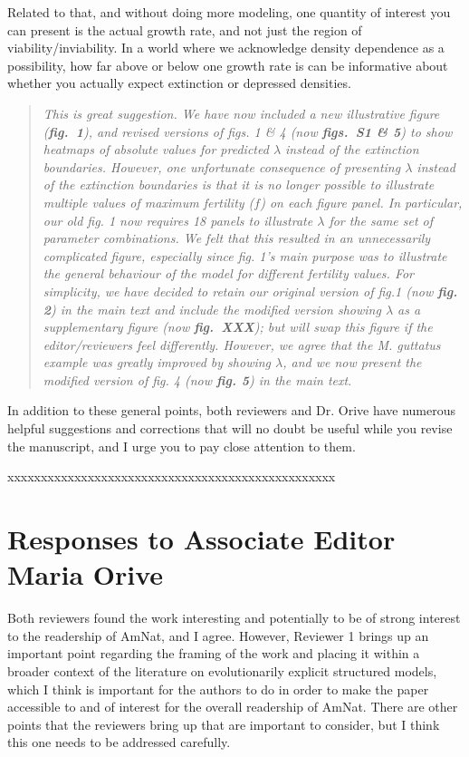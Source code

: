\documentclass[11pt]{article}
\begin{document}
Related to that, and without doing more modeling, one quantity of interest you can present is the actual growth rate, and not just the region of viability/inviability. In a world where we acknowledge density dependence as a possibility, how far above or below one growth rate is can be informative about whether you actually expect extinction or depressed densities.

\begin{quote}
	{\itshape This is great suggestion. We have now included a new illustrative figure ({\bf fig.~1}), and revised versions of figs. 1 \& 4 (now {\bf figs.~S1 \& 5}) to show heatmaps of absolute values for predicted $\lambda$ instead of the extinction boundaries. However, one unfortunate consequence of presenting $\lambda$ instead of the extinction boundaries is that it is no longer possible to illustrate multiple values of maximum fertility ($f$) on each figure panel. In particular, our old fig. 1 now requires 18 panels to illustrate $\lambda$ for the same set of parameter combinations. We felt that this resulted in an unnecessarily complicated figure, especially since fig. 1's main purpose was to illustrate the general behaviour of the model for different fertility values. For simplicity, we have decided to retain our original version of fig.1 (now {\bf fig. 2}) in the main text and include the modified version showing $\lambda$ as a supplementary figure (now {\bf fig.~XXX}); but will swap this figure if the editor/reviewers feel differently. However, we agree that the {\itshape M. guttatus} example was greatly improved by showing $\lambda$, and we now present the modified version of fig. 4 (now {\bf fig. 5}) in the main text}.
\end{quote}


In addition to these general points, both reviewers and Dr. Orive have numerous helpful suggestions and corrections that will no doubt be useful while you revise the manuscript, and I urge you to pay close attention to them.
\bigskip


\noindent xxxxxxxxxxxxxxxxxxxxxxxxxxxxxxxxxxxxxxxxxxxxxxxxx

\section*{Responses to Associate Editor Maria Orive}

Both reviewers found the work interesting and potentially to be of strong interest to the readership of AmNat, and I agree. However, Reviewer 1 brings up an important point regarding the framing of the work and placing it within a broader context of the literature on evolutionarily explicit structured models, which I think is important for the authors to do in order to make the paper accessible to and of interest for the overall readership of AmNat. There are other points that the reviewers bring up that are important to consider, but I think this one needs to be addressed carefully.
\end{document}

